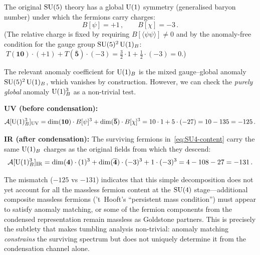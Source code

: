 \documentclass[11pt,a4paper]{article}
\begin{document}
The original $\mathrm{SU}(5)$ theory has a global $\mathrm{U}(1)$ symmetry
(generalised baryon number) under which the fermions carry charges:
\begin{equation}\label{eq:U1-charges}
  B[\psi] = +1\,,\qquad B[\chi] = -3\,.
\end{equation}
(The relative charge is fixed by requiring $B[\langle\psi\psi\rangle]
\neq 0$ and by the anomaly-free condition for the gauge group
$\mathrm{SU}(5)^2\,\mathrm{U}(1)_B$: $\;T(\mathbf{10})\cdot(+1) +
T(\overline{\mathbf{5}})\cdot(-3) = \tfrac{3}{2}\cdot 1 +
\tfrac{1}{2}\cdot(-3) = 0$.)

The relevant anomaly coefficient for $\mathrm{U}(1)_B$ is the mixed
gauge--global anomaly $\mathrm{SU}(5)^2\,\mathrm{U}(1)_B$, which vanishes by
construction.  However, we can check the \emph{purely global}
anomaly $\mathrm{U}(1)_B^3$ as a non-trivial test.

\textbf{UV (before condensation):}
\begin{equation}\label{eq:U1B3-UV}
  \mathcal{A}[\mathrm{U}(1)_B^3]_{\mathrm{UV}}
  = \dim(\mathbf{10})\cdot B[\psi]^3
  + \dim(\overline{\mathbf{5}})\cdot B[\chi]^3
  = 10 \cdot 1 + 5 \cdot (-27) = 10 - 135 = -125\,.
\end{equation}

\textbf{IR (after condensation):}  The surviving fermions
in~\eqref{eq:SU4-content} carry the same $\mathrm{U}(1)_B$ charges as the
original fields from which they descend:
\begin{equation}\label{eq:U1B3-IR}
  \mathcal{A}[\mathrm{U}(1)_B^3]_{\mathrm{IR}}
  = \dim(\mathbf{4})\cdot (1)^3
  + \dim(\overline{\mathbf{4}})\cdot (-3)^3
  + 1 \cdot (-3)^3
  = 4 - 108 - 27 = -131\,.
\end{equation}

The mismatch ($-125$ vs $-131$) indicates that this simple
decomposition does not yet account for all the massless fermion content
at the $\mathrm{SU}(4)$ stage---additional composite massless fermions
('t~Hooft's ``persistent mass condition'') must appear to satisfy
anomaly matching, or some of the fermion components from the condensed
representation remain massless as Goldstone partners.  This is
precisely the subtlety that makes tumbling analysis non-trivial:
anomaly matching \emph{constrains} the surviving spectrum but does not
uniquely determine it from the condensation channel alone.
\end{document}
